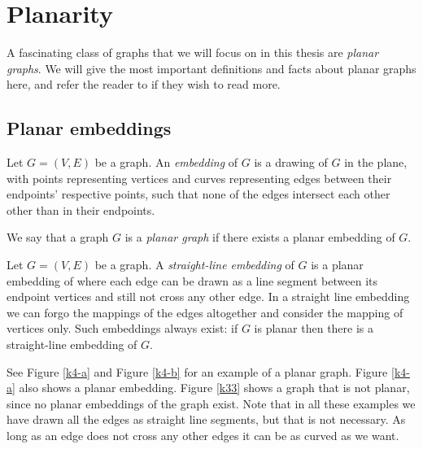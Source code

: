 \section{Planarity}
A fascinating class of graphs that we will focus on in this thesis are \emph{planar graphs}. We will give the most important definitions and facts about planar graphs here, and refer the reader to \cite{planar_graphs} if they wish to read more.

\subsection{Planar embeddings}
\begin{definition}[Embedding]
    Let $G = (V,E)$ be a graph. An \emph{embedding} of $G$ is a drawing of $G$ in the plane, with points representing vertices and curves representing edges between their endpoints' respective points, such that none of the edges intersect each other other than in their endpoints.    
\end{definition}

\begin{definition}
    We say that a graph $G$ is a \emph{planar graph} if there exists a planar embedding of $G$.
\end{definition}

\begin{definition}
    Let $G = (V,E)$ be a graph. A \emph{straight-line embedding} of $G$ is a planar embedding of where each edge can be drawn as a line segment between its endpoint vertices and still not cross any other edge. In a straight line embedding we can forgo the mappings of the edges altogether and consider the mapping of vertices only. Such embeddings always exist: if $G$ is planar then there is a straight-line embedding of $G$.
\end{definition}

See Figure \ref{k4-a} and Figure \ref{k4-b} for an example of a planar graph. Figure \ref{k4-a} also shows a planar embedding. Figure \ref{k33} shows a graph that is not planar, since no planar embeddings of the graph exist. Note that in all these examples we have drawn all the edges as straight line segments, but that is not necessary. As long as an edge does not cross any other edges it can be as curved as we want.

